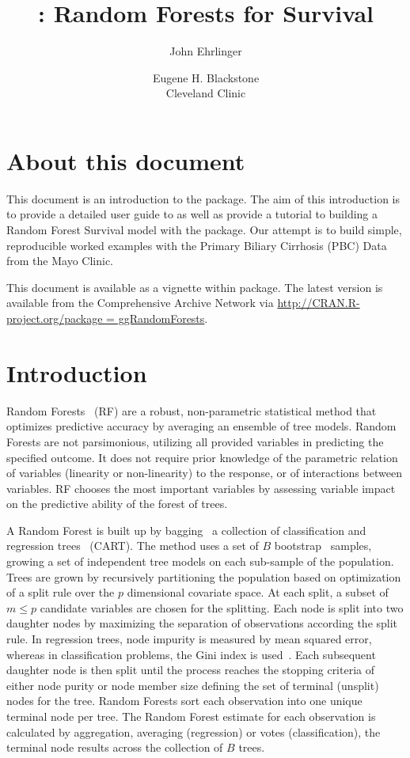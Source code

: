 \documentclass[nojss]{jss}\usepackage[]{graphicx}\usepackage[]{color}
\author{John Ehrlinger 
\and Eugene H. Blackstone\\Cleveland Clinic}
\title{\pkg{ggRandomForests}: Random Forests for Survival}
\begin{document}
\section{About this document}
This document is an introduction to the   package. The aim of this introduction is to provide a detailed user guide to  as well as provide a tutorial to building a Random Forest Survival model with the  package. Our attempt is to build simple, reproducible worked examples with the Primary Biliary Cirrhosis (PBC) Data from the Mayo Clinic.

This document is available as a vignette within  package. The latest version is available from the Comprehensive  Archive Network via \url{http://CRAN.R-project.org/package = ggRandomForests}.

\section{Introduction} \label{S:introduction}

Random Forests~\citep{Breiman:2001} (RF) are a robust, non-parametric statistical method that optimizes predictive accuracy by averaging an ensemble of tree models. Random Forests are not parsimonious, utilizing all provided variables in predicting the specified outcome. It does not require prior knowledge of the parametric relation of variables (linearity or non-linearity) to the response, or of interactions between variables. RF chooses the most important variables by assessing variable impact on the predictive ability of the forest of trees.

A Random Forest is built up by bagging~\citep{Breiman:1996} a collection of classification and regression trees~\citep{cart:1984} (CART). The method uses a set of $B$ bootstrap~\citep{bootstrap:1994} samples, growing a set of independent tree models on each sub-sample of the population. Trees are grown by recursively partitioning the population based on optimization of a split rule over the $p$ dimensional covariate space. At each split, a subset of $m \le p$ candidate variables are chosen for the splitting. Each node is split into two daughter nodes by maximizing the separation of observations according the split rule. In regression trees, node impurity is measured by mean squared error, whereas in classification problems, the Gini index is used~\citep{FriedmanGreedyfunction:2000}. Each subsequent daughter node is then split until the process reaches the stopping criteria of either node purity or node member size defining the set of terminal (unsplit) nodes for the tree. Random Forests sort each observation into one unique terminal node per tree. The Random Forest estimate for each observation is calculated by aggregation, averaging (regression) or votes (classification), the terminal node results across the collection of $B$ trees. 
\end{document}

